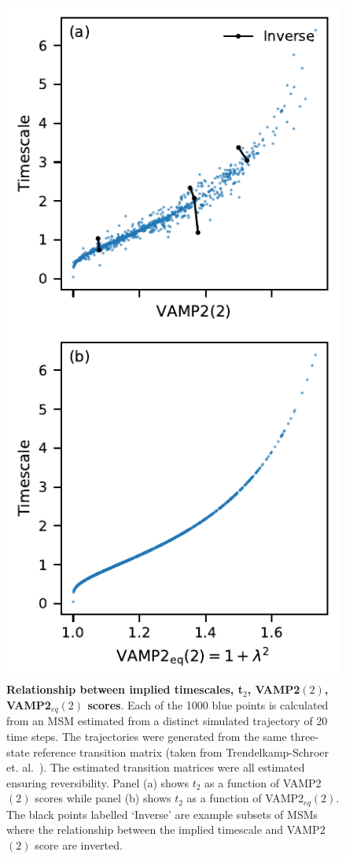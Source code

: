 \documentclass[journal=jacsat,manuscript=article]{achemso}
\begin{document}
\begin{figure}
    \centering
    \includegraphics{figures/timescale_vs_vamp_vs_evs.pdf}
    \caption{\textbf{Relationship between implied timescales, t$_2$, VAMP2$(2)$, VAMP2$_{eq}(2)$ scores}.  Each of the \num{1000} blue points is calculated from an MSM estimated from a distinct simulated trajectory of 20 time steps. The trajectories were generated from the same three-state reference transition matrix (taken from Trendelkamp-Schroer et. al.~\cite{trendelkamp-schroerEstimationUncertaintyReversible2015b}). The estimated transition matrices were all estimated ensuring reversibility. Panel (a) shows $t_2$ as a function of VAMP2$(2)$ scores while panel (b) shows  $t_2$ as a function of VAMP2$_{eq}(2)$. The black points labelled `Inverse' are example subsets of MSMs where the relationship between the implied timescale and VAMP2$(2)$ score are inverted.}
    \label{fig:bad_vamps_examples}
\end{figure}
\end{document}
